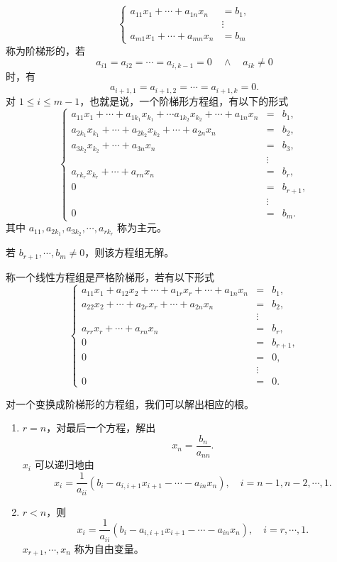 \newpage
\begin{definition}\label{p1:concept:c2-l61}
	\[
	\left\{
	\begin{aligned}
		a_{11}x_1+\cdots+a_{1n}x_n&=b_1,\\
		&\vdots\\
		a_{m1}x_1+\cdots+a_{mn}x_n&=b_m
	\end{aligned}
	\right.
	\]
	称为阶梯形的，若
	\[
	a_{i1}=a_{i2}=\cdots=a_{i,k-1}=0\quad\land\quad a_{ik}\neq0
	\]
	时，有
	\[
	a_{i+1,1}=a_{i+1,2}=\cdots=a_{i+1,k}=0.
	\]
	对 $1\leq i\leq m-1$，也就是说，一个阶梯形方程组，有以下的形式
	\[
	\left\{
	\begin{array}{rcl}
		a_{11}x_1+\cdots+a_{1k_1}x_{k_1}+\cdots a_{1k_2}x_{k_2}+\cdots+a_{1n}x_n&=&b_1,\\
		a_{2k_1}x_{k_1}+\cdots+a_{2k_2}x_{k_2}+\cdots+a_{2n}x_n&=&b_2,\\
		a_{3k_2}x_{k_2}+\cdots+a_{3n}x_n&=&b_3,\\
		&\vdots&\\
		a_{rk_r}x_{k_r}+\cdots+a_{rn}x_n&=&b_r,\\
		0&=&b_{r+1},\\
		&\vdots&\\
		0&=&b_m.
	\end{array}
	\right.
	\]
	其中 $a_{11},a_{2k_1},a_{3k_2},\cdots,a_{rk_r}$ 称为主元。
	
	若 $b_{r+1},\cdots,b_m\neq0$，则该方程组无解。
	
	称一个线性方程组是严格阶梯形，若有以下形式
	\[
	\left\{
	\begin{array}{rcl}
		a_{11}x_1+a_{12}x_2+\cdots+a_{1r}x_r+\cdots+a_{1n}x_n&=&b_1,\\
		a_{22}x_2+\cdots+a_{2r}x_r+\cdots+a_{2n}x_n&=&b_2,\\
		&\vdots&\\
		a_{rr}x_r+\cdots+a_{rn}x_n&=&b_r,\\
		0&=&b_{r+1},\\
		0&=&0,\\
		&\vdots&\\
		0&=&0.
	\end{array}
	\right.
	\]
	
\end{definition}
对一个变换成阶梯形的方程组，我们可以解出相应的根。
\begin{enumerate}
	\item $r=n$，对最后一个方程，解出
	\[
	x_n=\frac{b_n}{a_{nn}}.
	\]
	$x_i$ 可以递归地由
	\[
	x_i=\frac{1}{a_{ii}}\left(b_i-a_{i,i+1}x_{i+1}-\cdots-a_{in}x_n\right),\quad i=n-1,n-2,\cdots,1.
	\]
	\item $r<n$，则
	\[
	x_i=\frac{1}{a_{ii}}\left(b_i-a_{i,i+1}x_{i+1}-\cdots-a_{in}x_n\right),\quad i=r,\cdots,1.
	\]
	\label{p1:concept:c2-l129}$x_{r+1},\cdots,x_n$ 称为自由变量。
\end{enumerate}
